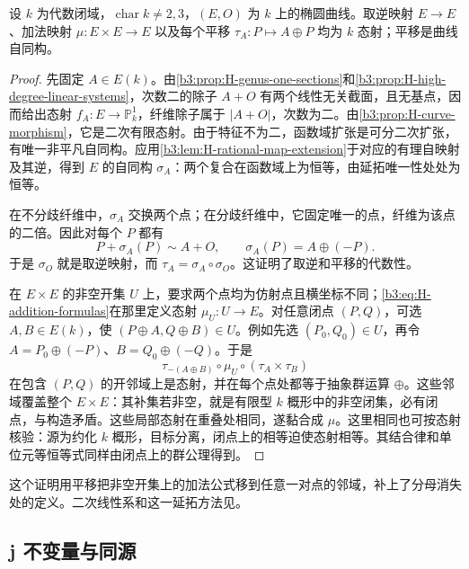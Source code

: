 \begin{proposition}\label{b3:prop:H-elliptic-group-morphisms}
	设 \(k\) 为代数闭域，\(\operatorname{char}k\ne2,3\)，\((E,O)\) 为 \(k\) 上的椭圆曲线。取逆映射 \(E\rightarrow E\)、加法映射 \(\mu:E\times E\rightarrow E\) 以及每个平移 \(\tau_A:P\mapsto A\oplus P\) 均为 \(k\) 态射；平移是曲线自同构。
\end{proposition}
\begin{proof}
	先固定 \(A\in E(k)\)。由\cref{b3:prop:H-genus-one-sections}和\cref{b3:prop:H-high-degree-linear-systems}，次数二的除子 \(A+O\) 有两个线性无关截面，且无基点，因而给出态射 \(f_A:E\rightarrow\mathbb P^1_k\)，纤维除子属于 \(|A+O|\)，次数为二。由\cref{b3:prop:H-curve-morphism}，它是二次有限态射。由于特征不为二，函数域扩张是可分二次扩张，有唯一非平凡自同构。应用\cref{b3:lem:H-rational-map-extension}于对应的有理自映射及其逆，得到 \(E\) 的自同构 \(\sigma_A\)：两个复合在函数域上为恒等，由延拓唯一性处处为恒等。

	在不分歧纤维中，\(\sigma_A\) 交换两个点；在分歧纤维中，它固定唯一的点，纤维为该点的二倍。因此对每个 \(P\) 都有
	\[
		P+\sigma_A(P)\sim A+O,
		\qquad \sigma_A(P)=A\oplus(-P).
	\]
	于是 \(\sigma_O\) 就是取逆映射，而 \(\tau_A=\sigma_A\circ\sigma_O\)。这证明了取逆和平移的代数性。

	在 \(E\times E\) 的非空开集 \(U\) 上，要求两个点均为仿射点且横坐标不同；\eqref{b3:eq:H-addition-formulas}在那里定义态射 \(\mu_U:U\rightarrow E\)。对任意闭点 \((P,Q)\)，可选 \(A,B\in E(k)\)，使 \((P\oplus A,Q\oplus B)\in U\)。例如先选 \((P_0,Q_0)\in U\)，再令 \(A=P_0\oplus(-P)\)、\(B=Q_0\oplus(-Q)\)。于是
	\[
		\tau_{-(A\oplus B)}\circ\mu_U\circ(\tau_A\times\tau_B)
	\]
	在包含 \((P,Q)\) 的开邻域上是态射，并在每个点处都等于抽象群运算 \(\oplus\)。这些邻域覆盖整个 \(E\times E\)：其补集若非空，就是有限型 \(k\) 概形中的非空闭集，必有闭点，与构造矛盾。这些局部态射在重叠处相同，遂黏合成 \(\mu\)。这里相同也可按态射核验：源为约化 \(k\) 概形，目标分离，闭点上的相等迫使态射相等。其结合律和单位元等恒等式同样由闭点上的群公理得到。
\end{proof}

这个证明用平移把非空开集上的加法公式移到任意一对点的邻域，补上了分母消失处的定义。二次线性系和这一延拓方法见\cite[Chapter IV, Lemma 4.2, Proposition 4.8, pp. 318, 321--322]{Hartshorne1977}。

\subsection{j 不变量与同源}
\label{b3:subsec:H04:03}

